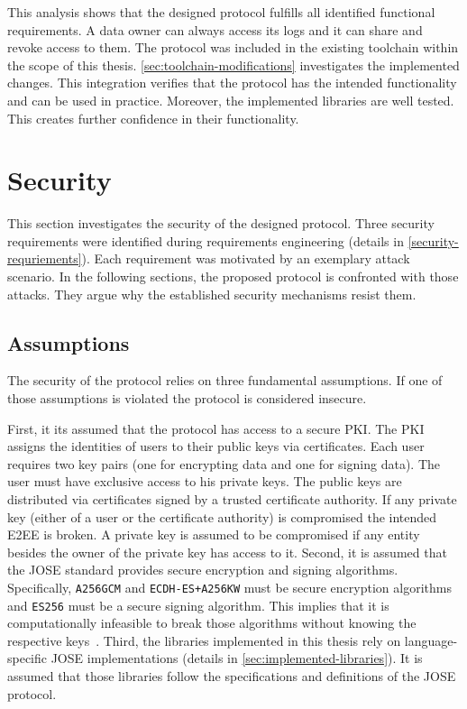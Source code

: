 \documentclass[../main.tex]{subfiles}
\begin{document}
This analysis shows that the designed protocol fulfills all identified functional requirements.
A data owner can always access its logs and it can share and revoke access to them.
The protocol was included in the existing toolchain within the scope of this thesis.
\cref{sec:toolchain-modifications} investigates the implemented changes.
This integration verifies that the protocol has the intended functionality and can be used in practice.
Moreover, the implemented libraries are well tested.
This creates further confidence in their functionality.

\section{Security}
\label{sec:evaluation-sec}

This section investigates the security of the designed protocol.
Three security requirements were identified during requirements engineering (details in \cref{security-requriements}).
Each requirement was motivated by an exemplary attack scenario.
In the following sections, the proposed protocol is confronted with those attacks.
They argue why the established security mechanisms resist them.

\subsection{Assumptions}

The security of the protocol relies on three fundamental assumptions.
If one of those assumptions is violated the protocol is considered insecure.

First, it its assumed that the protocol has access to a secure PKI.
The PKI assigns the identities of users to their public keys via certificates.
Each user requires two key pairs (one for encrypting data and one for signing data).
The user must have exclusive access to his private keys.
The public keys are distributed via certificates signed by a trusted certificate authority.
If any private key (either of a user or the certificate authority) is compromised the intended E2EE is broken.
A private key is assumed to be compromised if any entity besides the owner of the private key has access to it.
Second, it is assumed that the JOSE standard provides secure encryption and signing algorithms.
Specifically, \verb|A256GCM| and \verb|ECDH-ES+A256KW| must be secure encryption algorithms and \verb|ES256| must be a secure signing algorithm.
This implies that it is computationally infeasible to break those algorithms without knowing the respective keys~\cite{Katz2020}.
Third, the libraries implemented in this thesis rely on language-specific JOSE implementations (details in \cref{sec:implemented-libraries}).
It is assumed that those libraries follow the specifications and definitions of the JOSE protocol.
\end{document}
